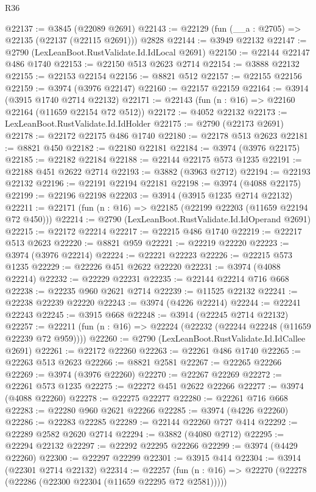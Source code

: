 \begin{lexlean}{R36}
\begin{coremodule}
@22137 := @3845 (@22089 @2691)
@22143 := @22129 (fun (__a : @2705) => @22135 (@22137 (@22115 @2691))) @2828
@22144 := @3949 @22132
@22147 := @2790 (LexLeanBoot.RustValidate.Id.IdLocal @2691)
@22150 := @22144 @22147 @486 @1740
@22153 := @22150 @513 @2623 @2714
@22154 := @3888 @22132
@22155 := @22153 @22154
@22156 := @8821 @512
@22157 := @22155 @22156
@22159 := @3974 (@3976 @22147)
@22160 := @22157 @22159
@22164 := @3914 (@3915 @1740 @2714 @22132)
@22171 := @22143 (fun (n : @16) => @22160 @22164 (@11659 @22154 @72 @512))
@22172 := @4052 @22132
@22173 := LexLeanBoot.RustValidate.Id.IdHolder
@22175 := @2790 (@22173 @2691)
@22178 := @22172 @22175 @486 @1740
@22180 := @22178 @513 @2623
@22181 := @8821 @450
@22182 := @22180 @22181
@22184 := @3974 (@3976 @22175)
@22185 := @22182 @22184
@22188 := @22144 @22175 @573 @1235
@22191 := @22188 @451 @2622 @2714
@22193 := @3882 (@3963 @2712)
@22194 := @22193 @22132
@22196 := @22191 @22194 @22181
@22198 := @3974 (@4088 @22175)
@22199 := @22196 @22198
@22203 := @3914 (@3915 @1235 @2714 @22132)
@22211 := @22171 (fun (n : @16) => @22185 (@22199 @22203 (@11659 @22194 @72 @450)))
@22214 := @2790 (LexLeanBoot.RustValidate.Id.IdOperand @2691)
@22215 := @22172 @22214
@22217 := @22215 @486 @1740
@22219 := @22217 @513 @2623
@22220 := @8821 @959
@22221 := @22219 @22220
@22223 := @3974 (@3976 @22214)
@22224 := @22221 @22223
@22226 := @22215 @573 @1235
@22229 := @22226 @451 @2622 @22220
@22231 := @3974 (@4088 @22214)
@22232 := @22229 @22231
@22235 := @22144 @22214 @716 @668
@22238 := @22235 @960 @2621 @2714
@22239 := @11525 @22132
@22241 := @22238 @22239 @22220
@22243 := @3974 (@4226 @22214)
@22244 := @22241 @22243
@22245 := @3915 @668
@22248 := @3914 (@22245 @2714 @22132)
@22257 := @22211 (fun (n : @16) => @22224 (@22232 (@22244 @22248 (@11659 @22239 @72 @959))))
@22260 := @2790 (LexLeanBoot.RustValidate.Id.IdCallee @2691)
@22261 := @22172 @22260
@22263 := @22261 @486 @1740
@22265 := @22263 @513 @2623
@22266 := @8821 @2581
@22267 := @22265 @22266
@22269 := @3974 (@3976 @22260)
@22270 := @22267 @22269
@22272 := @22261 @573 @1235
@22275 := @22272 @451 @2622 @22266
@22277 := @3974 (@4088 @22260)
@22278 := @22275 @22277
@22280 := @22261 @716 @668
@22283 := @22280 @960 @2621 @22266
@22285 := @3974 (@4226 @22260)
@22286 := @22283 @22285
@22289 := @22144 @22260 @727 @414
@22292 := @22289 @2582 @2620 @2714
@22294 := @3882 (@4080 @2712)
@22295 := @22294 @22132
@22297 := @22292 @22295 @22266
@22299 := @3974 (@4429 @22260)
@22300 := @22297 @22299
@22301 := @3915 @414
@22304 := @3914 (@22301 @2714 @22132)
@22314 := @22257
    (fun (n : @16) => @22270 (@22278 (@22286 (@22300 @22304 (@11659 @22295 @72 @2581)))))

\end{coremodule}
\end{lexlean}

